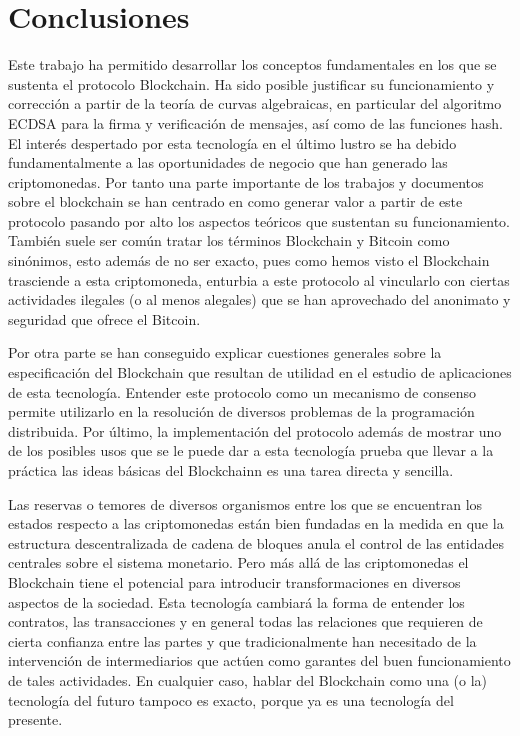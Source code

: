 \cleardoublepage

\chapter{Conclusiones}
\label{conclusiones}
Este trabajo ha permitido desarrollar los conceptos fundamentales en los que se sustenta el protocolo Blockchain. Ha sido posible justificar su funcionamiento y corrección a partir de la teoría de curvas algebraicas, en particular del algoritmo ECDSA para la firma y verificación de mensajes, así como de las funciones hash. El interés despertado por esta tecnología en el último lustro se ha debido fundamentalmente a las oportunidades de negocio que han generado las criptomonedas. Por tanto una parte importante de los trabajos y documentos sobre el blockchain se han centrado en como generar valor a partir de este protocolo pasando por alto los aspectos teóricos que sustentan su funcionamiento. 
También suele ser común tratar los términos Blockchain y Bitcoin como sinónimos, esto además de no ser exacto, pues como hemos visto el Blockchain trasciende a esta criptomoneda, enturbia a este protocolo al vincularlo con ciertas actividades ilegales (o al menos alegales) que se han aprovechado del anonimato y seguridad que ofrece el Bitcoin.


Por otra parte se han conseguido explicar cuestiones generales sobre la especificación del Blockchain que resultan de utilidad en el estudio de aplicaciones de esta tecnología. Entender este protocolo como un mecanismo de consenso permite utilizarlo en la resolución de diversos problemas de la programación distribuida. Por último, la implementación del protocolo además de mostrar uno de los posibles usos que se le puede dar a esta tecnología prueba que llevar a la práctica las ideas básicas del Blockchainn es una tarea directa y sencilla.


Las reservas o temores de diversos organismos entre los que se encuentran los estados respecto a las criptomonedas están bien fundadas en la medida en que la estructura descentralizada de cadena de bloques anula el control de las entidades centrales sobre el sistema monetario. Pero más allá de las criptomonedas el Blockchain tiene el potencial para introducir transformaciones en diversos aspectos de la sociedad. Esta tecnología cambiará la forma de entender los contratos, las transacciones y en general todas las relaciones que requieren de cierta confianza entre las partes y que tradicionalmente han necesitado de la intervención de intermediarios que actúen como garantes del buen funcionamiento de tales actividades. En cualquier caso, hablar del Blockchain como una (o la) tecnología del futuro tampoco es exacto, porque ya es una tecnología del presente.



